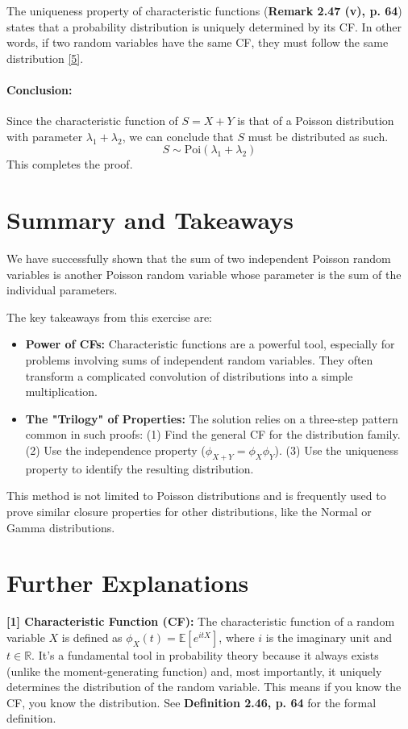 \documentclass[11pt,a4paper]{article}
\begin{document}
The uniqueness property of characteristic functions (\textbf{Remark 2.47 (v), p. 64}) states that a probability distribution is uniquely determined by its CF. In other words, if two random variables have the same CF, they must follow the same distribution \hyperlink{note5}{[5]}.

\paragraph{Conclusion:}
Since the characteristic function of $S = X+Y$ is that of a Poisson distribution with parameter $\lambda_1 + \lambda_2$, we can conclude that $S$ must be distributed as such.
\[ S \sim \text{Poi}(\lambda_1 + \lambda_2) \]
This completes the proof.

\section*{Summary and Takeaways}
We have successfully shown that the sum of two independent Poisson random variables is another Poisson random variable whose parameter is the sum of the individual parameters.

The key takeaways from this exercise are:
\begin{itemize}
    \item \textbf{Power of CFs:} Characteristic functions are a powerful tool, especially for problems involving sums of independent random variables. They often transform a complicated convolution of distributions into a simple multiplication.
    \item \textbf{The "Trilogy" of Properties:} The solution relies on a three-step pattern common in such proofs: (1) Find the general CF for the distribution family. (2) Use the independence property ($\phi_{X+Y} = \phi_X \phi_Y$). (3) Use the uniqueness property to identify the resulting distribution.
\end{itemize}

This method is not limited to Poisson distributions and is frequently used to prove similar closure properties for other distributions, like the Normal or Gamma distributions.

\newpage
\section*{Further Explanations}
\hypertarget{note1}{}{\textbf{[1] Characteristic Function (CF):}}
The characteristic function of a random variable $X$ is defined as $\phi_X(t) = \mathbb{E}[e^{itX}]$, where $i$ is the imaginary unit and $t \in \mathbb{R}$. It's a fundamental tool in probability theory because it always exists (unlike the moment-generating function) and, most importantly, it uniquely determines the distribution of the random variable. This means if you know the CF, you know the distribution. See \textbf{Definition 2.46, p. 64} for the formal definition.
\end{document}
